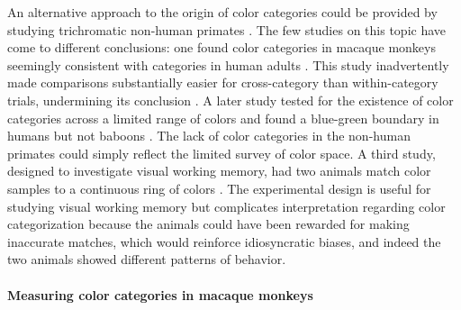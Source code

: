 An alternative approach to the origin of color categories could be provided by studying trichromatic non-human primates \citep{siuda-krzywicka_biological_2019}. 
The few studies on this topic have come to different conclusions: one found color categories in macaque monkeys seemingly consistent with categories in human adults \citep{sandell_color_1979}. 
This study inadvertently made comparisons substantially easier for cross-category than within-category trials, undermining its conclusion \citep{davidoff_cross-species_2010}. 
A later study tested for the existence of color categories across a limited range of colors and found a blue-green boundary in humans but not baboons \citep{fagot_cross-species_2006}.
The lack of color categories in the non-human primates could simply reflect the limited survey of color space. 
A third study, designed to investigate visual working memory, had two animals match color samples to a continuous ring of colors \citep{panichello_error-correcting_2019}. 
The experimental design is useful for studying visual working memory but complicates interpretation regarding color categorization because the animals could have been rewarded for making inaccurate matches, which would reinforce idiosyncratic biases, and indeed the two animals showed different patterns of behavior.

\paragraph{Measuring color categories in macaque monkeys}

